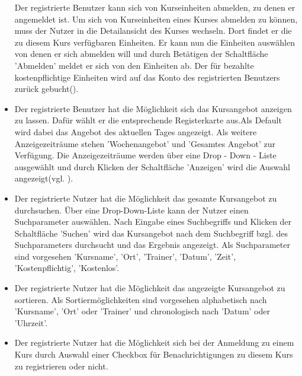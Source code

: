 \documentclass[a4paper]{scrreprt}
\begin{document}
\begin{itemize}
	Der registrierte Benutzer kann sich von Kurseinheiten abmelden, zu denen er angemeldet ist. Um sich von Kurseinheiten eines Kurses abmelden zu können, muss der Nutzer in die Detailansicht des Kurses wechseln. Dort findet er die zu diesem Kurs verfügbaren Einheiten.
	Er kann nun die Einheiten auswählen von denen er sich abmelden will und durch Betätigen der Schaltfläche 'Abmelden' meldet er sich von den Einheiten ab. Der für bezahlte kostenpflichtige Einheiten wird auf das Konto des registrierten Benutzers zurück gebucht().
	\item {}
	Der registrierte Benutzer hat die Möglichkeit sich das Kursangebot anzeigen zu lassen. Dafür wählt er die entsprechende Registerkarte aus.Als Default wird dabei das Angebot des aktuellen Tages angezeigt. Als weitere Anzeigezeiträume stehen 'Wochenangebot' und 'Gesamtes Angebot' zur Verfügung. Die Anzeigezeiträume werden über eine Drop - Down - Liste ausgewählt und durch Klicken der Schaltfläche 'Anzeigen' wird die Auswahl angezeigt(vgl. ).
	\item {}
	Der registrierte Nutzer hat die Möglichkeit das gesamte Kursangebot zu durchsuchen. Über eine Drop-Down-Liste kann der Nutzer einen Suchparameter auswählen. Nach Eingabe eines Suchbegriffs und Klicken der Schaltfläche 'Suchen' wird das Kursangebot nach dem Suchbegriff bzgl. des Suchparameters durchsucht und das Ergebnis angezeigt. 
	Als Suchparameter sind vorgesehen 'Kursname', 'Ort', 'Trainer', 'Datum', 'Zeit', 'Kostenpflichtig', 'Kostenlos'.
	\item {}
	Der registrierte Nutzer hat die Möglichkeit das angezeigte Kursangebot zu sortieren. Als Sortiermöglichkeiten sind vorgesehen alphabetisch nach 'Kursname', 'Ort' oder 'Trainer' und chronologisch nach 'Datum' oder 'Uhrzeit'.
	\item {}
	Der registrierte Nutzer hat die Möglichkeit sich bei der Anmeldung zu einem Kurs durch Auswahl einer Checkbox  für Benachrichtigungen zu diesem Kurs zu registrieren oder nicht.
	
\end{itemize}

 
\end{document}
